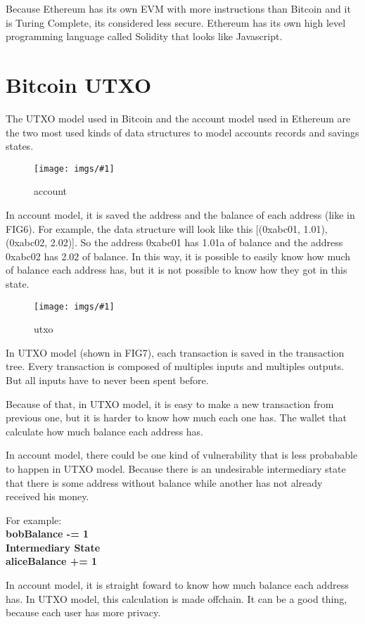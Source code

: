 \documentclass[12pt]{article}
\newcommand{\incgraph}[2]{\texttt{[image: imgs/\#1]}}
\newcommand{\incimgdiv}[3]{
  \begin{figure}
    \incgraph{#1.#2}{#3}
    \caption{#1}
    \label{fig:#1}
  \end{figure}
}
\newcommand{\incimg}[2]{\incimgdiv{#1}{#2}{1}}
\begin{document}
Because Ethereum has its own EVM with more instructions than Bitcoin and it is Turing Complete,
its considered less secure.
Ethereum has its own high level programming language called Solidity that looks like Javascript.

\section{Bitcoin UTXO}

The UTXO model used in Bitcoin and the account model used in Ethereum are the two most used kinds
of data structures to model accounts records and savings states.

\incimg{account}{jpeg}

In account model, it is saved the address and the balance of each address
(like in FIG6).
For example, the data structure will look like this [(0xabc01, 1.01), (0xabc02, 2.02)].
So the address 0xabc01 has 1.01a of balance and the address 0xabc02 has 2.02 of balance.
In this way, it is possible to easily know how much of balance each address has,
but it is not possible to know how they got in this state.

  \incimg{utxo}{png}

In UTXO model (shown in FIG7), each transaction is saved in the transaction tree.
Every transaction is composed of multiples inputs and multiples outputs.
But all inputs have to never been spent before.

Because of that, in UTXO model, it is easy to make a new transaction from previous one, but it is harder
to know how much each one has.
The wallet that calculate how much balance each address has.

In account model, there could be one kind of vulnerability that is less probabable to happen in UTXO
model.
Because there is an undesirable intermediary state that there is some address without balance while
another has not already received his money.

For example: \\
\textbf{
bobBalance -= 1 \\
Intermediary State \\
aliceBalance += 1
}

In account model, it is straight foward to know how much balance each address has.
In UTXO model, this calculation is made offchain. It can be a good thing,
because each user has more privacy.
\end{document}
